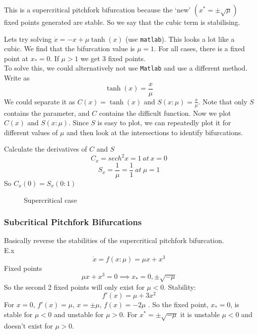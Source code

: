 \documentclass{/home/janmebows/Documents/LatexTemplates/myassignment}
\begin{document}
This is a supercritical pitchfork bifurcation because the `new' $(x^* = \pm \sqrt{\mu})$ fixed points generated are stable. So we say that the cubic term is stabilising.



Lets try solving $\dot{x} = -x + \mu \tanh(x)$ (use \verb|matlab|). This looks a lot like a cubic.
We find that the bifurcation value is $\mu = 1$. For all cases, there is a fixed point at $x_* = 0$. If $\mu >1$ we get 3 fixed points. \\
To solve this, we could alternatively not use \verb|Matlab| and use a different method. Write as
\[\tanh(x) = \frac{x}{\mu}\]
We could separate it as $C(x) = \tanh(x)$ and $S(x:\mu) =\frac{x}{\mu}$. Note that only $S$ contains the parameter, and $C$ contains the difficult function. Now we plot $C(x)$ and $S(x:\mu)$. Since $S$ is easy to plot, we can repeatedly plot it for different values of $\mu$ and then look at the intersections to identify bifurcations. 

Calculate the derivatives of $C$ and $S$
\[C_x = sech^2 x =1 \ at \ x=0 \]
\[S_x = \frac1\mu = \frac11 \ at \ \mu = 1\]
So $C_x(0) = S_x(0:1)$

\begin{figure}[h]
\centering
{}
\caption{Supercritical case}
\end{figure}


\subsubsection{Subcritical Pitchfork Bifurcations}
Basically reverse the stabilities of the supercritical pitchfork bifurcation. \\
E.x 
\[\dot{x} = f(x:\mu) = \mu x + x^3\]
Fixed points 
\[\mu x + x^3 = 0 \implies x_* = 0 , \pm \sqrt{-\mu}\]
So the second 2 fixed points will only exist for $\mu < 0$.
Stability:
\[f'(x) = \mu + 3x^2\]
For $x= 0$, $f'(x) = \mu$, $x=\pm\mu$, $f(x) = -2\mu$ .
So the fixed point, $x_*=0$,  is stable for $\mu <0$ and unstable for $\mu >0$.
For $x^* = \pm \sqrt{-\mu}$ it is unstable $\mu <0$ and doesn't exist for $\mu >0$.
\end{document}
